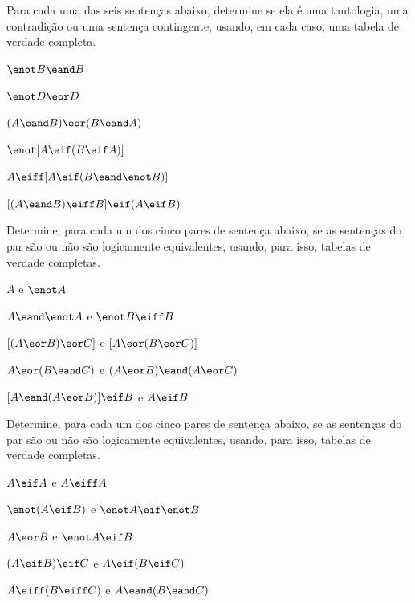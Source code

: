 \problempart Para cada uma das seis sentenças abaixo, determine se ela é uma tautologia, uma contradição ou uma sentença contingente, usando, em cada caso, uma tabela de verdade completa.
\begin{earg}
\item $\enot B \eand B$ \vspace{.5ex}%


\item $\enot D \eor D$ \vspace{.5ex}%


\item $(A\eand B) \eor (B\eand A)$\vspace{.5ex} %


\item $\enot[A \eif (B \eif A)]$\vspace{.5ex} %


\item $A \eiff [A \eif (B \eand \enot B)]$ \vspace{.5ex}%


\item $[(A \eand B) \eiff B] \eif (A \eif B)$ \vspace{.5ex}%

\end{earg}



\noindent\problempart
\label{pr.TT.equiv}
Determine, para cada um dos cinco pares de sentença abaixo, se as sentenças do par são ou não são logicamente equivalentes, usando, para isso, tabelas de verdade completas.
\begin{earg}
\item $A$ e $\enot A$
\item $A \eand \enot A$ e $\enot B \eiff B$
\item $[(A \eor B) \eor C]$ e $[A \eor (B \eor C)]$
\item $A \eor (B \eand C)$ e $(A \eor B) \eand (A \eor C)$
\item $[A \eand (A \eor B)] \eif B$ e $A \eif B$\end{earg}


\problempart
\label{pr.TT.equiv2}
Determine, para cada um dos cinco pares de sentença abaixo, se as sentenças do par são ou não são logicamente equivalentes, usando, para isso, tabelas de verdade completas.
\begin{earg}
\item $A\eif A$ e $A \eiff A$
\item $\enot(A \eif B)$ e $\enot A \eif \enot B$
\item $A \eor B$ e $\enot A \eif B$
\item$(A \eif B) \eif C$ e $A \eif (B \eif C)$
\item $A \eiff (B \eiff C)$ e $A \eand (B \eand C)$
\end{earg}

